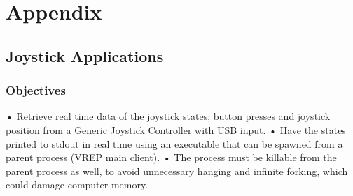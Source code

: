 \documentclass[12pt,openany,a4paper]{book}
\begin{document}

\chapter{Appendix}
\section{Joystick Applications}
\subsection{Objectives}
•	Retrieve real time data of the joystick states; button presses and joystick position from a Generic Joystick Controller with USB input.
•	Have the states printed to stdout in real time using an executable that can be spawned from a parent process (VREP main client).
•	The process must be killable from the parent process as well, to avoid unnecessary hanging and infinite forking, which could damage computer memory.
\end{document}
